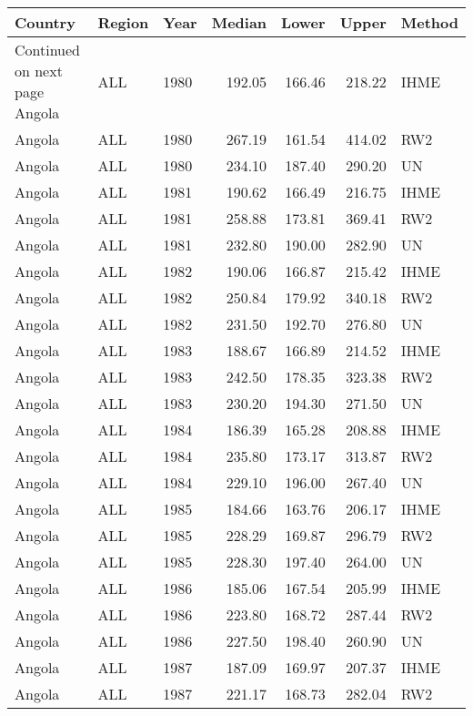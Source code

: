 \begin{longtable}{lllrrrl}
  \hline
Country & Region & Year & Median & Lower & Upper & Method \\ 
  \hline 
\endhead 
\hline 
{\footnotesize Continued on next page} 
\endfoot 
\endlastfoot 
Angola & ALL & 1980 & 192.05 & 166.46 & 218.22 & IHME \\ 
  Angola & ALL & 1980 & 267.19 & 161.54 & 414.02 & RW2 \\ 
  Angola & ALL & 1980 & 234.10 & 187.40 & 290.20 & UN \\ 
  Angola & ALL & 1981 & 190.62 & 166.49 & 216.75 & IHME \\ 
  Angola & ALL & 1981 & 258.88 & 173.81 & 369.41 & RW2 \\ 
  Angola & ALL & 1981 & 232.80 & 190.00 & 282.90 & UN \\ 
  Angola & ALL & 1982 & 190.06 & 166.87 & 215.42 & IHME \\ 
  Angola & ALL & 1982 & 250.84 & 179.92 & 340.18 & RW2 \\ 
  Angola & ALL & 1982 & 231.50 & 192.70 & 276.80 & UN \\ 
  Angola & ALL & 1983 & 188.67 & 166.89 & 214.52 & IHME \\ 
  Angola & ALL & 1983 & 242.50 & 178.35 & 323.38 & RW2 \\ 
  Angola & ALL & 1983 & 230.20 & 194.30 & 271.50 & UN \\ 
  Angola & ALL & 1984 & 186.39 & 165.28 & 208.88 & IHME \\ 
  Angola & ALL & 1984 & 235.80 & 173.17 & 313.87 & RW2 \\ 
  Angola & ALL & 1984 & 229.10 & 196.00 & 267.40 & UN \\ 
  Angola & ALL & 1985 & 184.66 & 163.76 & 206.17 & IHME \\ 
  Angola & ALL & 1985 & 228.29 & 169.87 & 296.79 & RW2 \\ 
  Angola & ALL & 1985 & 228.30 & 197.40 & 264.00 & UN \\ 
  Angola & ALL & 1986 & 185.06 & 167.54 & 205.99 & IHME \\ 
  Angola & ALL & 1986 & 223.80 & 168.72 & 287.44 & RW2 \\ 
  Angola & ALL & 1986 & 227.50 & 198.40 & 260.90 & UN \\ 
  Angola & ALL & 1987 & 187.09 & 169.97 & 207.37 & IHME \\ 
  Angola & ALL & 1987 & 221.17 & 168.73 & 282.04 & RW2 \\ 

\end{longtable}
